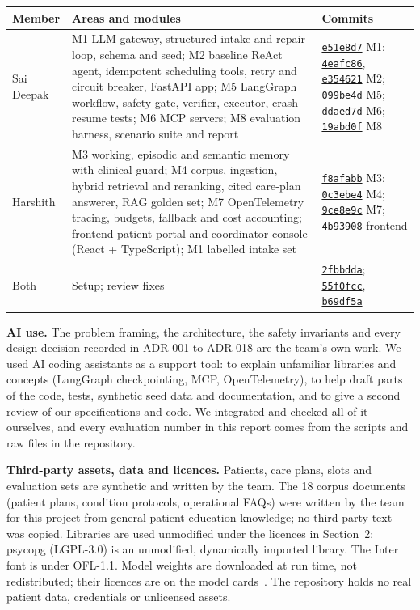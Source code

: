 \documentclass[10pt,a4paper]{article}
\newcommand{\repourl}{https://github.com/saideepaksana/careflow}
\newcommand{\commit}[1]{\href{\repourl/commit/#1}{\texttt{#1}}}
\begin{document}
\begin{table}[H]
\centering
\footnotesize
\begin{tabularx}{\textwidth}{P{2.5cm} L P{3.5cm}}
\toprule
\textbf{Member} & \textbf{Areas and modules} & \textbf{Commits} \\
\midrule
Sai Deepak & M1 LLM gateway, structured intake and repair loop, schema and seed; M2 baseline ReAct agent, idempotent scheduling tools, retry and circuit breaker, FastAPI app; M5 LangGraph workflow, safety gate, verifier, executor, crash-resume tests; M6 MCP servers; M8 evaluation harness, scenario suite and report & \commit{e51e8d7} M1; \commit{4eafc86}, \commit{e354621} M2; \commit{099be4d} M5; \commit{ddaed7d} M6; \commit{19abd0f} M8 \\
Harshith & M3 working, episodic and semantic memory with clinical guard; M4 corpus, ingestion, hybrid retrieval and reranking, cited care-plan answerer, RAG golden set; M7 OpenTelemetry tracing, budgets, fallback and cost accounting; frontend patient portal and coordinator console (React + TypeScript); M1 labelled intake set & \commit{f8afabb} M3; \commit{0c3ebe4} M4; \commit{9ce8e9c} M7; \commit{4b93908} frontend \\
Both & Setup; review fixes & \commit{2fbbdda}; \commit{55f0fcc}, \commit{b69df5a} \\
\bottomrule
\end{tabularx}
\end{table}

\textbf{AI use.} The problem framing, the architecture, the safety invariants and every design decision recorded in ADR-001 to ADR-018 are the team's own work. We used AI coding assistants as a support tool: to explain unfamiliar libraries and concepts (LangGraph checkpointing, MCP, OpenTelemetry), to help draft parts of the code, tests, synthetic seed data and documentation, and to give a second review of our specifications and code. We integrated and checked all of it ourselves, and every evaluation number in this report comes from the scripts and raw files in the repository.

\textbf{Third-party assets, data and licences.} Patients, care plans, slots and evaluation sets are synthetic and written by the team. The 18 corpus documents (patient plans, condition protocols, operational FAQs) were written by the team for this project from general patient-education knowledge; no third-party text was copied. Libraries are used unmodified under the licences in Section~2; psycopg (LGPL-3.0) is an unmodified, dynamically imported library. The Inter font is under OFL-1.1. Model weights are downloaded at run time, not redistributed; their licences are on the model cards~\cite{bge,gptoss}. The repository holds no real patient data, credentials or unlicensed assets.
\end{document}
